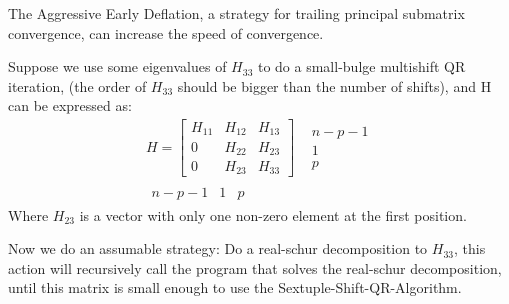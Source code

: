 The Aggressive Early Deflation, a strategy for trailing principal submatrix convergence, can increase the speed of convergence.

Suppose we use some eigenvalues of \(H_{33}\) to do a small-bulge multishift QR iteration, (the order of \(H_{33}\) should be bigger than the number of shifts), and H can be expressed as:
\[\begin{array}{*{20}{c}}
{H = \left[ {\begin{array}{*{20}{c}}
{{H_{11}}}&{{H_{12}}}&{{H_{13}}}\\
0&{{H_{22}}}&{{H_{23}}}\\
0&{{H_{23}}}&{{H_{33}}}
\end{array}} \right]}&{\begin{array}{*{20}{c}}
{n - p - 1}\\
1\\
p
\end{array}}\\
{\begin{array}{*{20}{c}}
{n - p - 1}&1&p
\end{array}}&{}
\end{array}\]
Where \(H_{23}\) is a vector with only one non-zero element at the first position.

Now we do an assumable strategy: Do a real-schur decomposition to \(H_{33}\), this action will recursively call the program that solves the real-schur decomposition, until this matrix is small enough to use the Sextuple-Shift-QR-Algorithm.


